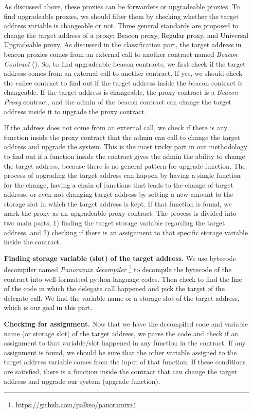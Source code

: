 As discussed above, these proxies can be forwarders or upgradeable proxies. To find upgradeable proxies, we should filter them by checking whether the target address variable is changeable or not. Three general standards are proposed to change the target address of a proxy: Beacon proxy, Regular proxy, and Universal Upgradeable proxy. 
As discussed in the classification part, the target address in beacon proxies comes from an external call to another contract named \textit{Beacon Contract} (). So, to find upgradeable beacon contracts, we first check if the target address comes from an external call to another contract. If yes, we should check the callee contract to find out if the target address inside the beacon contract is changeable. If the target address is changeable, the proxy contract is a \textit{Beacon Proxy} contract, and the admin of the beacon contract can change the target address inside it to upgrade the proxy contract. 

If the address does not come from an external call, we check if there is any function inside the proxy contract that the admin can call to change the target address and upgrade the system. This is the most tricky part in our methodology to find out if a function inside the contract gives the admin the ability to change the target address, because there is no general pattern for upgrade function. The process of upgrading the target address can happen by having a single function for the change, having a chain of functions that leads to the change of target address, or even not changing target address by setting a new amount to the storage slot in which the target address is kept.
If that function is found, we mark the proxy as an upgradeable proxy contract. The process is divided into two main parts; 1) finding the target storage variable regarding the target address, and 2) checking if there is an assignment to that specific storage variable inside the contract.

\textbf{Finding storage variable (slot) of the target address.} We use bytecode decompiler named \textit{Panoramix decompiler} \footnote{\url{https://github.com/palkeo/panoramix}} to decompile the bytecode of the contract into well-formatted python language codes. Then check to find the line of the code in which the delegate call happened and pick the target of the delegate call. We find the variable name or a storage slot of the target address, which is our goal in this part.

\textbf{Checking for assignment.} Now that we have the decompiled code and variable name (or storage slot) of the target address, we parse the code and check if an assignment to that variable/slot happened in any function in the contract. If any assignment is found, we should be sure that the other variable assigned to the target address variable comes from the input of that function. If these conditions are satisfied, there is a function inside the contract that can change the target address and upgrade our system (upgrade function).

